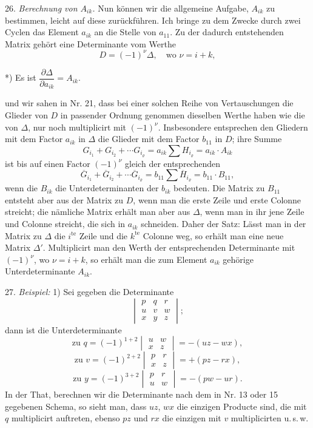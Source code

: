 \documentclass[11pt]{article}
\providecommand{\weberpage}[1]{}
\let\Delta\varDelta
\begin{document}
26. \textit{Berechnung von $A_{ik}$.} Nun k\"onnen wir die allgemeine Aufgabe,
$A_{ik}$ zu bestimmen, leicht auf diese zur\"uckf\"uhren. Ich bringe zu dem
Zwecke durch zwei Cyclen das Element $a_{ik}$ an die Stelle von $a_{11}$. Zu
der dadurch entstehenden Matrix geh\"ort eine Determinante vom Werthe
\[
D = (-1)^{\nu}\Delta, \quad \text{wo } \nu = i + k,
\]

*) Es ist $\dfrac{\partial \Delta}{\partial a_{ik}} = A_{ik}$.


\weberpage{33}

und wir sahen in Nr. 21, dass bei einer solchen Reihe von Vertauschungen die
Glieder von $D$ in passender Ordnung genommen dieselben Werthe haben wie die
von $\Delta$, nur noch multiplicirt mit $(-1)^\nu$. Insbesondere entsprechen
den Gliedern mit dem Factor $a_{ik}$ in $\Delta$ die Glieder mit dem Factor
$b_{11}$ in $D$; ihre Summe
\[
G_{i_1}+G_{i_2}+\cdots G_{i_\varrho}=a_{ik}\sum H_{i_\varrho}=a_{ik}\cdot A_{ik}
\]
ist bis auf einen Factor $(-1)^\nu$ gleich der entsprechenden
\[
\overline{G}_{i_1}+\overline{G}_{i_2}+\cdots \overline{G}_{i_\varrho}=b_{11}\sum \overline{H}_{i_\varrho}=b_{11}\cdot B_{11},
\]
wenn die $B_{ik}$ die Unterdeterminanten der $b_{ik}$ bedeuten. Die Matrix zu
$B_{11}$ entsteht aber aus der Matrix zu $D$, wenn man die erste Zeile und
erste Colonne streicht; die nämliche Matrix erhält man aber aus $\Delta$,
wenn man in ihr jene Zeile und Colonne streicht, die sich in $a_{ik}$
schneiden. Daher der Satz: \glqq Lässt man in der Matrix zu $\Delta$ die
$i^{\text{te}}$ Zeile und die $k^{\text{te}}$ Colonne weg, so erhält man eine
neue Matrix $\Delta'$. Multiplicirt man den Werth der entsprechenden
Determinante mit $(-1)^\nu$, wo $\nu=i+k$, so erhält man die zum Element
$a_{ik}$ gehörige Unterdeterminante $A_{ik}$.\grqq{}

27. \textit{Beispiel:} 1) Sei gegeben die Determinante
\[
\begin{vmatrix} p & q & r \\ u & v & w \\ x & y & z \end{vmatrix};
\]
dann ist die Unterdeterminante
\[
\text{zu } q=(-1)^{1+2}\begin{vmatrix} u & w \\ x & z \end{vmatrix}=-(uz-wx),
\]
\[
\text{zu } v=(-1)^{2+2}\begin{vmatrix} p & r \\ x & z \end{vmatrix}=+(pz-rx),
\]
\[
\text{zu } y=(-1)^{3+2}\begin{vmatrix} p & r \\ u & w \end{vmatrix}=-(pw-ur).
\]
In der That, berechnen wir die Determinante nach dem in Nr. 13 oder 15
gegebenen Schema, so sieht man, dass $uz$, $wx$ die einzigen Producte sind,
die mit $q$ multiplicirt auftreten, ebenso $pz$ und $rx$ die einzigen mit $v$
multiplicirten u.\,s.\,w.
\end{document}
